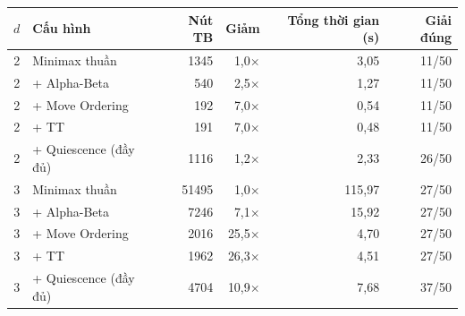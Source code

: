 \begin{tabular}{c l r r r r}
\toprule
$d$ & Cấu hình & Nút TB & Giảm & Tổng thời gian (s) & Giải đúng \\
\midrule
2 & Minimax thuần & 1345 & 1,0$\times$ & 3,05 & 11/50 \\
2 & + Alpha-Beta & 540 & 2,5$\times$ & 1,27 & 11/50 \\
2 & + Move Ordering & 192 & 7,0$\times$ & 0,54 & 11/50 \\
2 & + TT & 191 & 7,0$\times$ & 0,48 & 11/50 \\
2 & + Quiescence (đầy đủ) & 1116 & 1,2$\times$ & 2,33 & 26/50 \\
3 & Minimax thuần & 51495 & 1,0$\times$ & 115,97 & 27/50 \\
3 & + Alpha-Beta & 7246 & 7,1$\times$ & 15,92 & 27/50 \\
3 & + Move Ordering & 2016 & 25,5$\times$ & 4,70 & 27/50 \\
3 & + TT & 1962 & 26,3$\times$ & 4,51 & 27/50 \\
3 & + Quiescence (đầy đủ) & 4704 & 10,9$\times$ & 7,68 & 37/50 \\
\bottomrule
\end{tabular}

